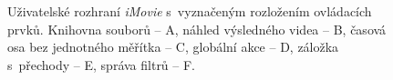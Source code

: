 \begin{figure}[h]
	\centering
	\caption{Uživatelské rozhraní \textit{iMovie} s~vyznačeným rozložením ovládacích prvků. Knihovna souborů -- A, náhled výsledného videa -- B, časová osa bez jednotného měřítka -- C, globální akce -- D, záložka s~přechody -- E, správa filtrů -- F.}\label{img:imovie}
\end{figure}

